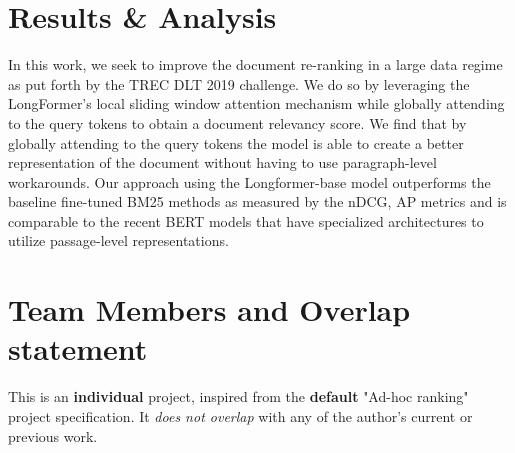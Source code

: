 \documentclass[sigconf, nonacm=true]{acmart}
\begin{document}
\section{Results \& Analysis} \label{results}

In this work, we seek to improve the document re-ranking in a large data regime as put forth by the TREC DLT 2019 challenge. We do so by leveraging the LongFormer's local sliding window attention mechanism while globally attending to the query tokens to obtain a document relevancy score. We find that by globally attending to the query tokens the model is able to create a better representation of the document without having to use paragraph-level workarounds. Our approach using the Longformer-base model outperforms the baseline fine-tuned BM25 methods as measured by the nDCG, AP metrics and is comparable to the recent BERT models that have specialized architectures to utilize passage-level representations.

\section*{\small{Team Members and Overlap statement}}

This is an \textbf{individual} project, inspired from the \textbf{default} "Ad-hoc ranking" project specification. It \textit{does not overlap} with any of the author's current or previous work.



\end{document}
